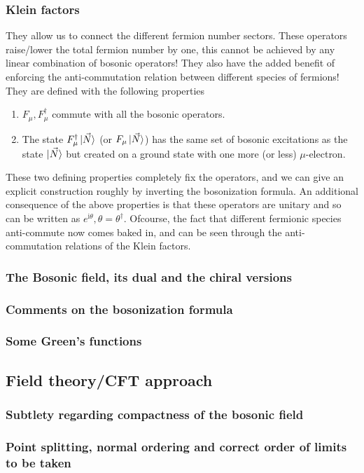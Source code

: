 \documentclass{article}
\renewcommand{\i}{\mathrm{i}}
\renewcommand{\i}{\mathrm{i}}
\begin{document}
\subsubsection{Klein factors}
They allow us to connect the different fermion number sectors. These operators raise/lower the total fermion number by one, this cannot be achieved by any linear combination of bosonic operators! They also have the added benefit of enforcing the anti-commutation relation between different species of fermions!
They are defined with the following properties
\begin{enumerate}
    \item $F_{\mu}, F^{\dagger} _{\mu}$ commute with all the bosonic operators.
    \item The state $F^{\dagger}_\mu \ket{\vec{N}}$ (or $F_\mu \ket{\vec{N}}$) has the same set of bosonic excitations as the state $\ket{\vec{N}}$ but created on a ground state with one more (or less) $\mu$-electron.
\end{enumerate}
These two defining properties completely fix the operators, and we can give an explicit construction roughly by inverting the bosonization formula. An additional consequence of the above properties is that these operators are unitary and so can be written as $e^{\i\theta}, \theta = \theta^{\dagger}$. Ofcourse, the fact that different fermionic species anti-commute now comes baked in, and can be seen through the anti-commutation relations of the Klein factors.
\subsubsection{The Bosonic field, its dual and the chiral versions}
\subsubsection{Comments on the bosonization formula}
\subsubsection{Some Green's functions}
\subsection{Field theory/CFT approach}
\subsubsection{Subtlety regarding compactness of the bosonic field}
\subsubsection{Point splitting, normal ordering and correct order of limits to be taken}
\end{document}
